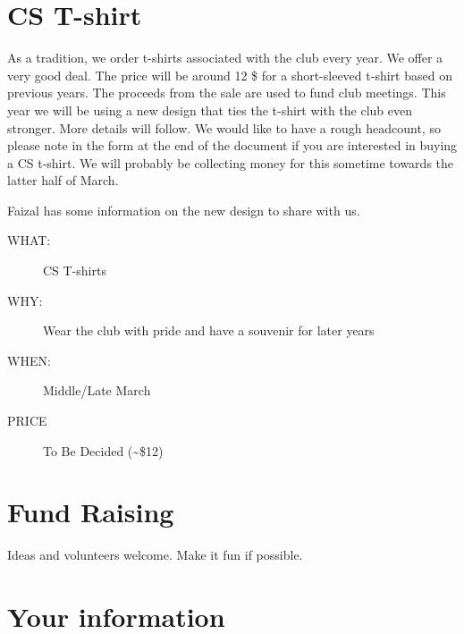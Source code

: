 \newpage


\section{CS T-shirt}
\label{sec-10}

As a tradition, we order t-shirts associated with the club every year. We offer
a very good deal. The price will be around 12 \$ for a short-sleeved t-shirt
based on previous years. The proceeds from the sale are used to fund club
meetings. This year we will be using a new design that ties the t-shirt with
the club even stronger. More details will follow. We would like to have a rough
headcount, so please note in the form at the end of the document if you are
interested in buying a CS t-shirt. We will probably be collecting money for
this sometime towards the latter half of March.

Faizal has some information on the new design to share with us.

\begin{description}
\item[{WHAT:}] CS T-shirts
\item[{WHY:}] Wear the club with pride and have a souvenir for later years
\item[{WHEN:}] Middle/Late March
\item[{PRICE}] To Be Decided (\textasciitilde{}\$12)
\end{description}


\newpage


\section{Fund Raising}
\label{sec-11}

Ideas and volunteers welcome. Make it fun if possible.


\newpage


\section{Your information}
\label{sec-12}

